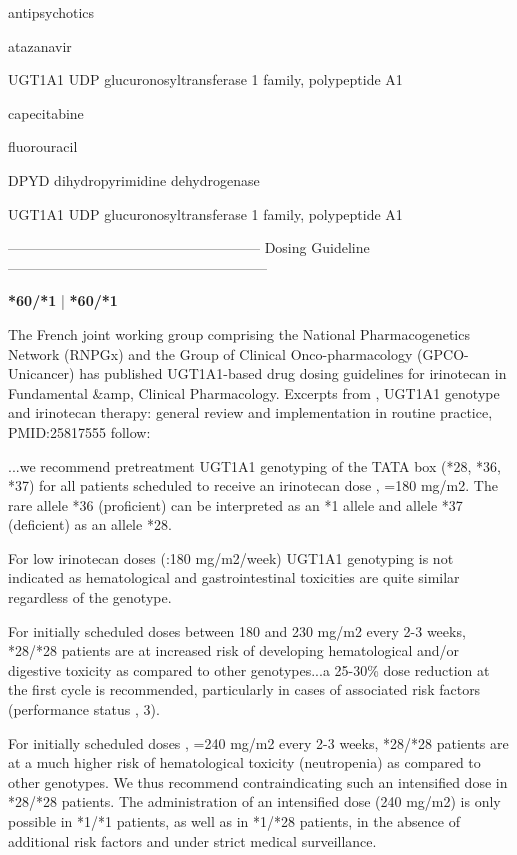 \documentclass{resume} %
\begin{document}
\begin{rSection}{ antipsychotics }
\begin{rSection}{ atazanavir }
\begin{rSubsection}{ UGT1A1 }{ UDP glucuronosyltransferase 1 family, polypeptide A1 }{}{}
\begin{rSection}{ capecitabine }
\begin{rSection}{ fluorouracil }
\begin{rSubsection}{ DPYD }{ dihydropyrimidine dehydrogenase }{}{}
\end{rSubsection}
\end{rSection}

\begin{rSubsection}{ UGT1A1 }{ UDP glucuronosyltransferase 1 family, polypeptide A1 }{}{}
\item[]
\item[] ------------------------------------------------------ Dosing Guideline --------------------------------------------------------\newline
\item[]
\item[] \textbf{ *60/*1 } | \textbf{ *60/*1 }
\item The French joint working group comprising the National Pharmacogenetics Network (RNPGx) and the Group of Clinical Onco-pharmacology (GPCO-Unicancer) has published UGT1A1-based drug dosing guidelines for irinotecan in Fundamental &amp,  Clinical Pharmacology. Excerpts from , UGT1A1 genotype and irinotecan therapy: general review and implementation in routine practice,  PMID:25817555 follow:
 \newline
\item ...we recommend pretreatment UGT1A1 genotyping of the TATA box (*28, *36, *37) for all patients scheduled to receive an irinotecan dose , =180 mg/m2. The rare allele *36 (proficient) can be interpreted as an *1 allele and allele *37 (deficient) as an allele *28.
 \newline
\item For low irinotecan doses (:180 mg/m2/week) UGT1A1 genotyping is not indicated as hematological and gastrointestinal toxicities are quite similar regardless of the genotype.
 \newline
\item For initially scheduled doses between 180 and 230 mg/m2 every 2-3 weeks, *28/*28 patients are at increased risk of developing hematological and/or digestive toxicity as compared to other genotypes...a 25-30\% dose reduction at the first cycle is recommended, particularly in cases of associated risk factors (performance status , 3).
 \newline
\item For initially scheduled doses , =240 mg/m2 every 2-3 weeks, *28/*28 patients are at a much higher risk of hematological toxicity (neutropenia) as compared to other genotypes. We thus recommend contraindicating such an intensified dose in *28/*28 patients. The administration of an intensified dose (240 mg/m2) is only possible in *1/*1 patients, as well as in *1/*28 patients, in the absence of additional risk factors and under strict medical surveillance.

\end{rSubsection}
\end{rSection}
\end{rSubsection}
\end{rSection}
\end{rSection}
\end{document}
